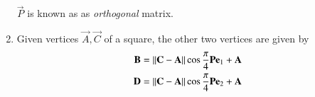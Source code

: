 \begin{enumerate}[label=\thesubsection.\arabic*.,ref=\thesubsection.\theenumi]
		$\vec{P}$ is known as as {\em orthogonal} matrix.
\item Given vertices $\vec{A}, \vec{C}$ of a square, the other two vertices are given by
\begin{align}
\begin{split}
	\mathbf{B} = \left\lVert\mathbf{C}-\mathbf{A}\right\rVert\cos \frac{\pi}{4}\mathbf{P}\mathbf{e}_1+\mathbf{A}
	\\
	\mathbf{D} = \left\lVert\mathbf{C}-\mathbf{A}\right\rVert\cos \frac{\pi}{4}\mathbf{P}\mathbf{e}_2+\mathbf{A}
\end{split}
	\label{eq:affine-square-bd}
\end{align}
\iffalse
	\\
		\solution Shifting $\vec{A}$ to the origin and rotating the square clockwise by an angle $\phi$ made by $CA$ with the $x$-axis,
	from \eqref{eq:conic_affine},
\begin{align}
\vec{A} = \vec{P}\vec{0}+\vec{c}
\\
\implies 
\vec{c} = \vec{A}
\\
	\theta =  \phi -\frac{\pi}{4} 
\end{align}
and we obtain a square with the other vertices as
\begin{align}
\begin{split}
	\vec{B}_1 = \norm{\vec{C}-\vec{A}}\cos \frac{\pi}{4}\vec{e}_1
	\\
	\vec{D}_1 = \norm{\vec{C}-\vec{A}}\cos \frac{\pi}{4}\vec{e}_2
\end{split}
	\label{eq:affine-bd}
\end{align}
	From \eqref{eq:conic_affine}
	and 
	\eqref{eq:affine-bd},
	we obtain \eqref{eq:affine-square-bd}.
	\fi
\end{enumerate}
